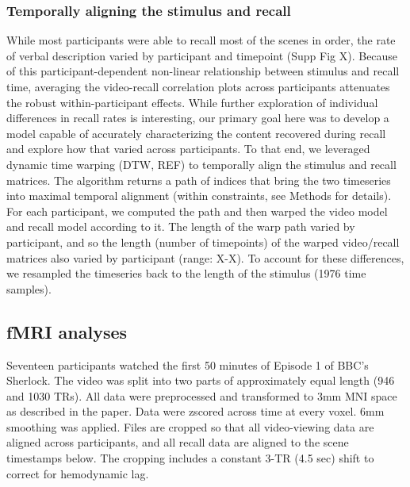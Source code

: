 \subsubsection{Temporally aligning the stimulus and recall}
While most participants were able to recall most of the scenes in order, the rate of verbal description varied by participant and timepoint (Supp Fig X). Because of this participant-dependent non-linear relationship between stimulus and recall time, averaging the video-recall correlation plots across participants attenuates the robust within-participant effects. While further exploration of individual differences in recall rates is interesting, our primary goal here was to develop a model capable of accurately characterizing the content recovered during recall and explore how that varied across participants.  To that end, we leveraged dynamic time warping (DTW, REF) to temporally align the stimulus and recall matrices.  The algorithm returns a path of indices that bring the two timeseries into maximal temporal alignment (within constraints, see Methods for details).  For each participant, we computed the path and then warped the video model and recall model according to it. The length of the warp path varied by participant, and so the length (number of timepoints) of the warped video/recall matrices also varied by participant (range: X-X). To account for these differences, we resampled the timeseries back to the length of the stimulus (1976 time samples).

\subsection{fMRI analyses}
Seventeen participants watched the first 50 minutes of Episode 1 of BBC's Sherlock. The video was split into two parts of approximately equal length (946 and 1030 TRs). All data were preprocessed and transformed to 3mm MNI space as described in the paper. Data were zscored across time at every voxel. 6mm smoothing was applied.
Files are cropped so that all video-viewing data are aligned across participants, and all recall data are aligned to the scene timestamps below. The cropping includes a constant 3-TR (4.5 sec) shift to correct for hemodynamic lag.

